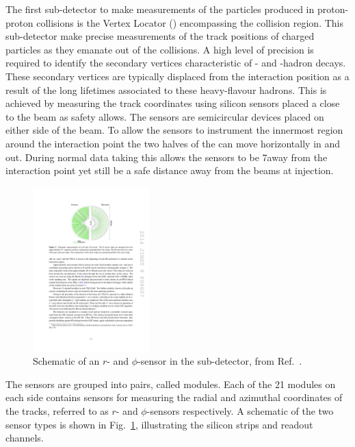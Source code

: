 The first sub-detector to make measurements of the particles produced in proton-proton collisions is the Vertex Locator (\velo) encompassing the collision region. This sub-detector make precise measurements of the track positions of charged particles as they emanate out of the collisions. A high level of precision is required to identify the secondary vertices characteristic of \bquark- and \cquark-hadron decays. These secondary vertices are typically displaced from the interaction position as a result of the long lifetimes associated to these heavy-flavour hadrons. This is achieved by measuring the track coordinates using silicon sensors placed a close to the \lhc beam as safety allows. The \velo sensors are semicircular devices placed on either side of the beam. To allow the sensors to instrument the innermost region around the interaction point the two halves of the \velo can move horizontally in and out. During normal data taking this allows the sensors to be 7\mm away from the interaction point yet still be a safe distance away from the beams at injection. 

\begin{figure}[!h]
    \centering   
    \includegraphics[width=0.4\textwidth]{figs/Detector/velo_r_phi_sensor.pdf}
    \caption{Schematic of an $r$- and $\phi$-sensor in the \velo sub-detector, from Ref.~\cite{LHCb-DP-2014-001}.}
    \label{fig:Dec_r_phi_sensor}   
\end{figure}

The sensors are grouped into pairs, called modules. Each of the 21 modules on each side contains sensors for measuring the radial and azimuthal coordinates of the tracks, referred to as $r$- and $\phi$-sensors respectively. A schematic of the two sensor types is shown in Fig.~\ref{fig:Dec_r_phi_sensor}, illustrating the silicon strips and readout channels. 


